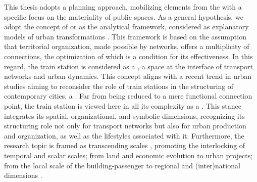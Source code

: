 \begin{refsegment}
This thesis adopts a planning approach, mobilizing elements from the  with a specific focus on the materiality of public spaces. As a general hypothesis, we adopt the concept of  or  as the analytical framework, considered as explanatory models of urban transformations \textcolor{blue}{\autocite[]{dupuy_urbanisme_1991}}. This framework is based on the assumption that territorial organization, made possible by networks, offers a multiplicity of connections, the optimization of which is a condition for its effectiveness. In this regard, the train station is considered as a  \textcolor{blue}{\autocite[7]{moretti_interconnexion_1999}}, a space at the interface of transport networks and urban dynamics. This concept aligns with a recent trend in urban studies aiming to reconsider the role of train stations in the structuring of contemporary cities, a  \textcolor{blue}{\autocite[489]{delage_gare_2013}}. Far from being reduced to a mere functional connection point, the train station is viewed here in all its complexity as a  \textcolor{blue}{\autocites[395]{le_bot_quel_2019}{le_bot_management_2020}}. This stance integrates its spatial, organizational, and symbolic dimensions, recognizing its structuring role not only for transport networks but also for urban production and organization, as well as the lifestyles associated with it. Furthermore, the research topic is framed as transcending scales \textcolor{blue}{\autocite[3]{knowles_transit_2019}}, promoting the interlocking of temporal and scalar scales; from land and economic evolution to urban projects; from the local scale of the building-passenger to regional and (inter)national dimensions \textcolor{blue}{\autocites[13-14]{menerault_gares_2001}[238]{chapelon_transports_2016}}.%


\end{refsegment}

